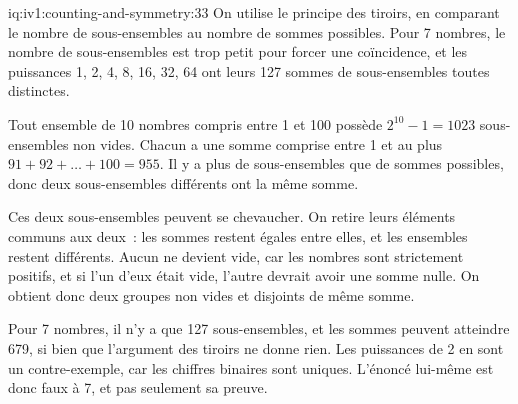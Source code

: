 \begin{solution}{iq:iv1:counting-and-symmetry:33}
On utilise le principe des tiroirs, en comparant le nombre de sous-ensembles au nombre de sommes possibles. Pour 7 nombres, le nombre de sous-ensembles est trop petit pour forcer une coïncidence, et les puissances 1, 2, 4, 8, 16, 32, 64 ont leurs 127 sommes de sous-ensembles toutes distinctes.

Tout ensemble de 10 nombres compris entre 1 et 100 possède $2^{10} - 1 = 1023$ sous-ensembles non vides. Chacun a une somme comprise entre 1 et au plus $91 + 92 + \dots + 100 = 955$. Il y a plus de sous-ensembles que de sommes possibles, donc deux sous-ensembles différents ont la même somme.

Ces deux sous-ensembles peuvent se chevaucher. On retire leurs éléments communs aux deux~: les sommes restent égales entre elles, et les ensembles restent différents. Aucun ne devient vide, car les nombres sont strictement positifs, et si l'un d'eux était vide, l'autre devrait avoir une somme nulle. On obtient donc deux groupes non vides et disjoints de même somme.

Pour 7 nombres, il n'y a que 127 sous-ensembles, et les sommes peuvent atteindre 679, si bien que l'argument des tiroirs ne donne rien. Les puissances de 2 en sont un contre-exemple, car les chiffres binaires sont uniques. L'énoncé lui-même est donc faux à 7, et pas seulement sa preuve.

\end{solution}

